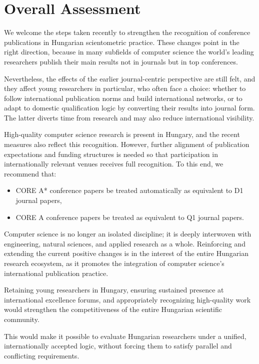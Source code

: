 \documentclass[12pt,a4paper]{article}
\begin{document}
\section{Overall Assessment}

We welcome the steps taken recently to strengthen the recognition of conference publications in Hungarian scientometric practice. These changes point in the right direction, because in many subfields of computer science the world's leading researchers publish their main results not in journals but in top conferences.

Nevertheless, the effects of the earlier journal-centric perspective are still felt, and they affect young researchers in particular, who often face a choice: whether to follow international publication norms and build international networks, or to adapt to domestic qualification logic by converting their results into journal form. The latter diverts time from research and may also reduce international visibility.

High-quality computer science research is present in Hungary, and the recent measures also reflect this recognition. However, further alignment of publication expectations and funding structures is needed so that participation in internationally relevant venues receives full recognition. To this end, we recommend that:
\begin{itemize}
  \item CORE A\!* conference papers be treated automatically as equivalent to D1 journal papers,
  \item CORE A conference papers be treated as equivalent to Q1 journal papers.
\end{itemize}

Computer science is no longer an isolated discipline; it is deeply interwoven with engineering, natural sciences, and applied research as a whole. Reinforcing and extending the current positive changes is in the interest of the entire Hungarian research ecosystem, as it promotes the integration of computer science's international publication practice.

Retaining young researchers in Hungary, ensuring sustained presence at international excellence forums, and appropriately recognizing high-quality work would strengthen the competitiveness of the entire Hungarian scientific community.

This would make it possible to evaluate Hungarian researchers under a unified, internationally accepted logic, without forcing them to satisfy parallel and conflicting requirements.



\end{document}
